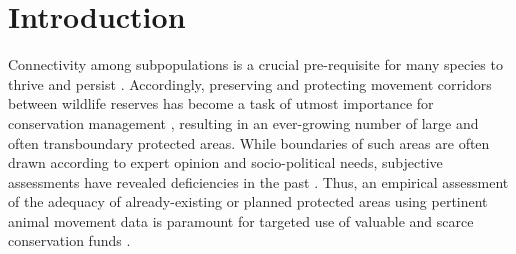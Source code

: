 \documentclass[abstract=on,10pt,a4paper,bibliography=totocnumbered]{article}
\begin{document}
\newpage


\linenumbers

\section{Introduction}
Connectivity among subpopulations is a crucial pre-requisite for many species to
thrive and persist \citep{Fahrig.2003}. Accordingly, preserving and protecting
movement corridors between wildlife reserves has become a task of utmost
 importance for conservation management
\citep{Doerr.2011, Rudnick.2012}, resulting in an ever-growing number of large
and often transboundary protected areas. While boundaries of such areas are
often drawn according to expert opinion and socio-political needs, subjective
assessments have revealed deficiencies in the past \citep{Clevenger.2002,
Pullinger.2010}. Thus, an empirical assessment of the adequacy of
already-existing or planned protected areas using pertinent animal movement data
is paramount for targeted use of valuable and scarce conservation funds
\citep{Pullinger.2010}.
\end{document}
